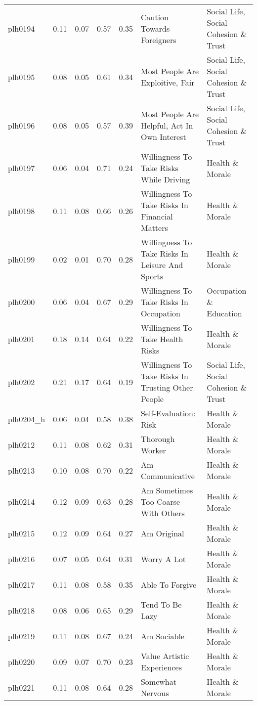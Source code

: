 \begin{longtable}{l|rrrrll}
plh0194 & 0.11 & 0.07 & 0.57 & 0.35 & Caution Towards Foreigners & Social Life, Social Cohesion \& Trust \\ 
plh0195 & 0.08 & 0.05 & 0.61 & 0.34 & Most People Are Exploitive, Fair & Social Life, Social Cohesion \& Trust \\ 
plh0196 & 0.08 & 0.05 & 0.57 & 0.39 & Most People Are Helpful, Act In Own Interest & Social Life, Social Cohesion \& Trust \\ 
plh0197 & 0.06 & 0.04 & 0.71 & 0.24 & Willingness To Take Risks While Driving & Health \& Morale \\ 
plh0198 & 0.11 & 0.08 & 0.66 & 0.26 & Willingness To Take Risks In Financial Matters & Health \& Morale \\ 
plh0199 & 0.02 & 0.01 & 0.70 & 0.28 & Willingness To Take Risks In Leisure And Sports & Health \& Morale \\ 
plh0200 & 0.06 & 0.04 & 0.67 & 0.29 & Willingness To Take Risks In Occupation & Occupation \& Education \\ 
plh0201 & 0.18 & 0.14 & 0.64 & 0.22 & Willingness To Take Health Risks & Health \& Morale \\ 
plh0202 & 0.21 & 0.17 & 0.64 & 0.19 & Willingness To Take Risks In Trusting Other People & Social Life, Social Cohesion \& Trust \\ 
plh0204\_h & 0.06 & 0.04 & 0.58 & 0.38 & Self-Evaluation: Risk & Health \& Morale \\ 
plh0212 & 0.11 & 0.08 & 0.62 & 0.31 & Thorough Worker & Health \& Morale \\ 
plh0213 & 0.10 & 0.08 & 0.70 & 0.22 & Am Communicative & Health \& Morale \\ 
plh0214 & 0.12 & 0.09 & 0.63 & 0.28 & Am Sometimes Too Coarse With Others & Health \& Morale \\ 
plh0215 & 0.12 & 0.09 & 0.64 & 0.27 & Am Original & Health \& Morale \\ 
plh0216 & 0.07 & 0.05 & 0.64 & 0.31 & Worry A Lot & Health \& Morale \\ 
plh0217 & 0.11 & 0.08 & 0.58 & 0.35 & Able To Forgive & Health \& Morale \\ 
plh0218 & 0.08 & 0.06 & 0.65 & 0.29 & Tend To Be Lazy & Health \& Morale \\ 
plh0219 & 0.11 & 0.08 & 0.67 & 0.24 & Am Sociable & Health \& Morale \\ 
plh0220 & 0.09 & 0.07 & 0.70 & 0.23 & Value Artistic Experiences & Health \& Morale \\ 
plh0221 & 0.11 & 0.08 & 0.64 & 0.28 & Somewhat Nervous & Health \& Morale \\ 

\end{longtable}

